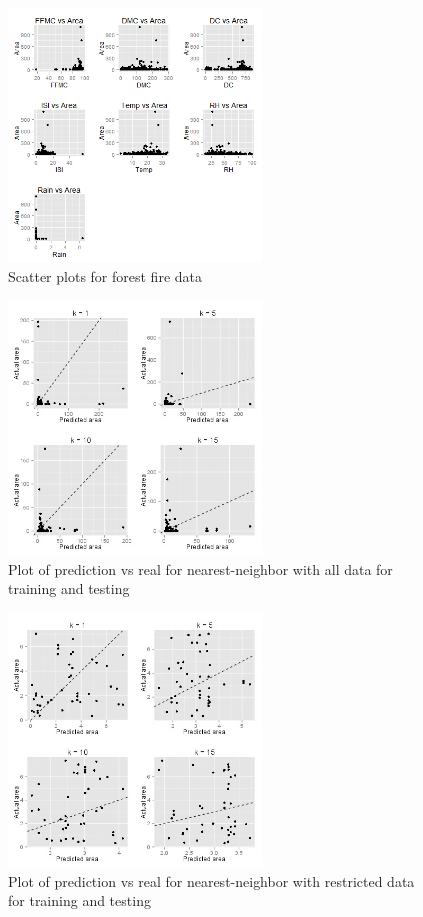 \documentclass{article}
\begin{document}
\begin{figure}[h]
  \centering
  \includegraphics[width=0.6\textwidth]{forestfire.jpg}
  \caption{Scatter plots for forest fire data}
  \label{fig:fire_scatters}
\end{figure}
\newpage

\begin{figure}
  \centering
  \includegraphics[width=0.6\textwidth]{knn_good_whole.jpg}
  \caption{Plot of prediction vs real for nearest-neighbor with all data for
  training and testing}
  \label{fig:knn_whole}
\end{figure}

\begin{figure}
  \centering
  \includegraphics[width=0.6\textwidth]{knn_good_own.jpg}
  \caption{Plot of prediction vs real for nearest-neighbor with restricted data
    for training and testing}
  \label{fig:knn_own}
\end{figure}
\end{document}
